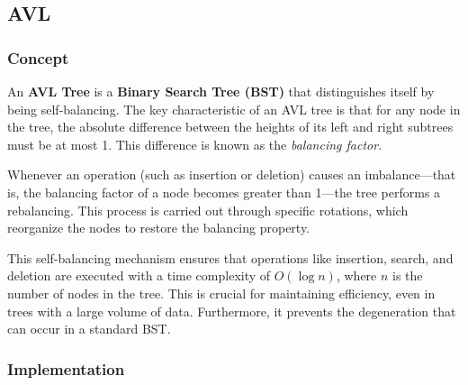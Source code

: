\subsection{AVL}

\subsubsection{Concept}

An \textbf{AVL Tree} is a \textbf{Binary Search Tree (BST)} that distinguishes itself by being self-balancing. The key characteristic of an AVL tree is that for any node in the tree, the absolute difference between the heights of its left and right subtrees must be at most 1. This difference is known as the \textit{balancing factor}.

Whenever an operation (such as insertion or deletion) causes an imbalance---that is, the balancing factor of a node becomes greater than 1---the tree performs a rebalancing. This process is carried out through specific rotations, which reorganize the nodes to restore the balancing property.

This self-balancing mechanism ensures that operations like insertion, search, and deletion are executed with a time complexity of $O(\log n)$, where $n$ is the number of nodes in the tree. This is crucial for maintaining efficiency, even in trees with a large volume of data. Furthermore, it prevents the degeneration that can occur in a standard BST.


\subsubsection{Implementation}

